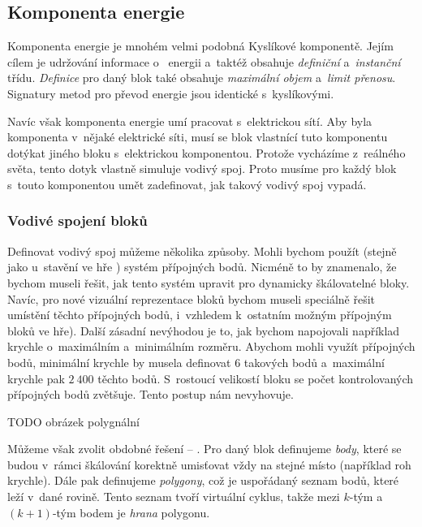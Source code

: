 \subsection{Komponenta energie}

Komponenta energie je mnohém velmi podobná Kyslíkové komponentě. Jejím cílem je udržování informace o~ energii a~taktéž obsahuje \textit{definiční} a~\textit{instanční} třídu. \textit{Definice} pro daný blok také obsahuje \textit{maximální objem} a~\textit{limit přenosu}. Signatury metod pro převod energie jsou identické s~kyslíkovými.

Navíc však komponenta energie umí pracovat s~elektrickou sítí. Aby byla komponenta v~nějaké elektrické síti, musí se blok vlastnící tuto komponentu dotýkat jiného bloku s~elektrickou komponentou. Protože vycházíme z~reálného světa, tento dotyk vlastně simuluje vodivý spoj. Proto musíme pro každý blok s~touto komponentou umět zadefinovat, jak takový vodivý spoj vypadá.

\subsubsection{Vodivé spojení bloků}

Definovat vodivý spoj můžeme několika způsoby. Mohli bychom použít (stejně jako u~stavění ve hře \TM{}) systém přípojných bodů. Nicméně to by znamenalo, že bychom museli řešit, jak tento systém upravit pro dynamicky škálovatelné bloky. Navíc, pro nové vizuální reprezentace bloků bychom museli speciálně řešit umístění těchto přípojných bodů, i~vzhledem k~ostatním možným přípojným bloků ve hře). Další zásadní nevýhodou je to, jak bychom napojovali například krychle o~maximálním a~minimálním rozměru. Abychom mohli využít přípojných bodů, minimální krychle by musela definovat $6$ takových bodů a~maximální krychle pak $2~400$ těchto bodů. S~rostoucí velikostí bloku se počet kontrolovaných přípojných bodů zvětšuje.  Tento postup nám nevyhovuje.

TODO obrázek polygnální 

Můžeme však zvolit obdobné řešení -- . Pro daný blok definujeme \textit{body}, které se budou v~rámci škálování korektně umisťovat vždy na stejné místo (například roh krychle). Dále pak definujeme \textit{polygony}, což je uspořádaný seznam bodů, které leží v~dané rovině. Tento seznam tvoří virtuální cyklus, takže mezi $k$-tým a~$(k+1)$-tým bodem je \textit{hrana} polygonu.

